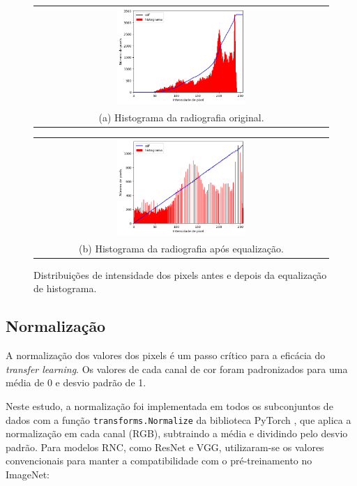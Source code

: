 \begin{figure}[ht]
    \centering
    \begin{tabular}{@{}c@{}}
        \includegraphics[width=0.45\textwidth]{figs/histograma-imagem-nao-equalizada.png} \\[\abovecaptionskip]
        \small (a) Histograma da radiografia original.
    \end{tabular}
    \hfill
    \begin{tabular}{@{}c@{}}
        \includegraphics[width=0.45\textwidth]{figs/histograma-imagem-equalizada.png} \\[\abovecaptionskip]
        \small (b) Histograma da radiografia após equalização.
    \end{tabular}
    \caption{Distribuições de intensidade dos pixels antes e depois da equalização de histograma.}
    \label{fig:histogram-equalization-histogram}
\end{figure}

\subsection{Normalização}

A normalização dos valores dos pixels é um passo crítico para a eficácia do \textit{transfer learning}. Os valores de cada canal de cor foram padronizados para uma média de 0 e desvio padrão de 1.

Neste estudo, a normalização foi implementada em todos os subconjuntos de dados com a função \texttt{transforms.Normalize} da biblioteca PyTorch \cite{pytorch}, que aplica a normalização em cada canal (RGB), subtraindo a média e dividindo pelo desvio padrão. Para modelos RNC, como ResNet e VGG, utilizaram-se os valores convencionais para manter a compatibilidade com o pré-treinamento no ImageNet:

